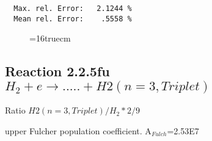 \documentclass[12pt]{article}
\begin{document}
\begin{small}
\begin{verbatim}
  Max. rel. Error:   2.1244 %
  Mean rel. Error:    .5558 %

\end{verbatim}\end{small}
\begin{figure} \label{2.2.5fl}
\epsfxsize=16truecm
\end{figure}
\newpage

\subsection{
Reaction 2.2.5fu $H_2 + e \rightarrow .....+H2(n=3,Triplet)$}

Ratio $H2(n=3, Triplet)/H_2*2/9 $

upper Fulcher population coefficient. A$_{Fulch}$=2.53E7
\end{document}
